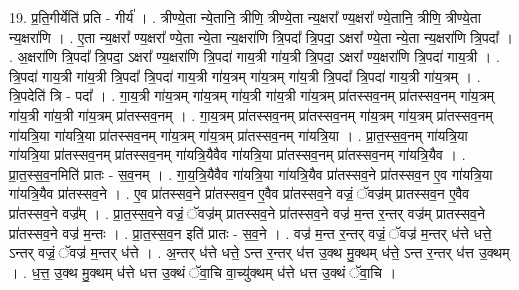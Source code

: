 \documentclass[17pt]{extarticle}
\begin{document}
19. प्र॒ति॒गीर्येति॑ प्रति - गीर्य॑ । . त्रीण्ये॒ता न्ये॒तानि॒ त्रीणि॒ त्रीण्ये॒ता न्य॒क्षरा᳚ ण्य॒क्षरा᳚ ण्ये॒तानि॒ त्रीणि॒ त्रीण्ये॒ता न्य॒क्षरा॑णि । . ए॒ता न्य॒क्षरा᳚ ण्य॒क्षरा᳚ ण्ये॒ता न्ये॒ता न्य॒क्षरा॑णि त्रि॒पदा᳚ त्रि॒पदा॒ ऽक्षरा᳚ ण्ये॒ता न्ये॒ता न्य॒क्षरा॑णि त्रि॒पदा᳚ । . अ॒क्षरा॑णि त्रि॒पदा᳚ त्रि॒पदा॒ ऽक्षरा᳚ ण्य॒क्षरा॑णि त्रि॒पदा॑ गाय॒त्री गा॑य॒त्री त्रि॒पदा॒ ऽक्षरा᳚ ण्य॒क्षरा॑णि त्रि॒पदा॑ गाय॒त्री । . त्रि॒पदा॑ गाय॒त्री गा॑य॒त्री त्रि॒पदा᳚ त्रि॒पदा॑ गाय॒त्री गा॑य॒त्रम् गा॑य॒त्रम् गा॑य॒त्री त्रि॒पदा᳚ त्रि॒पदा॑ गाय॒त्री गा॑य॒त्रम् । . त्रि॒पदेति॑ त्रि - पदा᳚ । . गा॒य॒त्री गा॑य॒त्रम् गा॑य॒त्रम् गा॑य॒त्री गा॑य॒त्री गा॑य॒त्रम् प्रा॑तस्सव॒नम् प्रा॑तस्सव॒नम् गा॑य॒त्रम् गा॑य॒त्री गा॑य॒त्री गा॑य॒त्रम् प्रा॑तस्सव॒नम् । . गा॒य॒त्रम् प्रा॑तस्सव॒नम् प्रा॑तस्सव॒नम् गा॑य॒त्रम् गा॑य॒त्रम् प्रा॑तस्सव॒नम् गा॑यत्रि॒या गा॑यत्रि॒या प्रा॑तस्सव॒नम् गा॑य॒त्रम् गा॑य॒त्रम् प्रा॑तस्सव॒नम् गा॑यत्रि॒या । . प्रा॒त॒स्स॒व॒नम् गा॑यत्रि॒या गा॑यत्रि॒या प्रा॑तस्सव॒नम् प्रा॑तस्सव॒नम् गा॑यत्रि॒यैवैव गा॑यत्रि॒या प्रा॑तस्सव॒नम् प्रा॑तस्सव॒नम् गा॑यत्रि॒यैव । . प्रा॒त॒स्स॒व॒नमिति॑ प्रातः - स॒व॒नम् । . गा॒य॒त्रि॒यैवैव गा॑यत्रि॒या गा॑यत्रि॒यैव प्रा॑तस्सव॒ने प्रा॑तस्सव॒न ए॒व गा॑यत्रि॒या गा॑यत्रि॒यैव प्रा॑तस्सव॒ने । . ए॒व प्रा॑तस्सव॒ने प्रा॑तस्सव॒न ए॒वैव प्रा॑तस्सव॒ने वज्रं॒ ॅवज्र॑म् प्रातस्सव॒न ए॒वैव प्रा॑तस्सव॒ने वज्र᳚म् । . प्रा॒त॒स्स॒व॒ने वज्रं॒ ॅवज्र॑म् प्रातस्सव॒ने प्रा॑तस्सव॒ने वज्र॑ म॒न्त र॒न्तर् वज्र॑म् प्रातस्सव॒ने प्रा॑तस्सव॒ने वज्र॑ म॒न्तः । . प्रा॒त॒स्स॒व॒न इति॑ प्रातः - स॒व॒ने । . वज्र॑ म॒न्त र॒न्तर् वज्रं॒ ॅवज्र॑ म॒न्तर् ध॑त्ते धत्ते॒ ऽन्तर् वज्रं॒ ॅवज्र॑ म॒न्तर् ध॑त्ते । . अ॒न्तर् ध॑त्ते धत्ते॒ ऽन्त र॒न्तर् ध॑त्त उ॒क्थ मु॒क्थम् ध॑त्ते॒ ऽन्त र॒न्तर् ध॑त्त उ॒क्थम् । . ध॒त्त॒ उ॒क्थ मु॒क्थम् ध॑त्ते धत्त उ॒क्थं ॅवा॒चि वा॒च्यु॑क्थम् ध॑त्ते धत्त उ॒क्थं ॅवा॒चि । \newline
\end{document}
